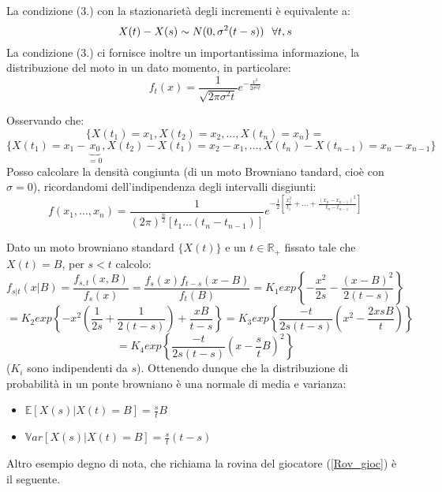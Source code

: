 La condizione (3.) con la stazionarietà degli incrementi è equivalente a: 
\[X(t)-X(s)\sim N(0,\sigma^2(t-s)) \hspace{7px} \forall t,s\]
La condizione (3.) ci fornisce inoltre un importantissima informazione, la distribuzione del moto in un dato momento, in particolare:
\[f_t(x)=\frac{1}{\sqrt{2\pi\sigma^2 t}}e^{-\frac{x^2}{2\sigma^2t}}\]

Osservando che:
\[\{X(t_1)=x_1,X(t_2)=x_2,\dots,X(t_n)=x_n\}=\]
\[\{X(t_1)=x_1-\underbrace{x_0}_{=0},X(t_2)-X(t_1)=x_2-x_1,\dots,X(t_n)-X(t_{n-1})=x_n-x_{n-1}\}\]
Posso calcolare la densità congiunta (di un moto Browniano tandard, cioè con $\sigma=0$), ricordandomi dell'indipendenza degli intervalli disgiunti:
\[f(x_1,\dots,x_n)=\frac{1}{(2\pi)^{\frac{n}{2}}[t_1\dots(t_n-t_{n-1})]}e^{-\frac{1}{2}\left[\frac{x_1^2}{t_1}+\dots+\frac{(x_n-x_{n-1})^2}{t_n-t_{n-1}}\right]}\]

\begin{example}
Dato un moto browniano standard $\{X(t)\}$ e un $t\in\mathbb{R}_+$ fissato tale che $X(t)=B$, per $s<t$ calcolo:
\[f_{s|t}(x|B)=\frac{f_{s,t}(x,B)}{f_{s}(x)}=\frac{f_s(x)f_{t-s}(x-B)}{f_t(B)}=K_1exp\left\{-\frac{x^2}{2s}-\frac{(x-B)^2}{2(t-s)}\right\}\]
\[=K_2exp\left\{-x^2\left(\frac{1}{2s}+\frac{1}{2(t-s)}\right)+\frac{xB}{t-s}\right\}=K_3exp\left\{\frac{-t}{2s(t-s)}\left(x^2-\frac{2xsB}{t}\right)\right\}\]
\[=K_4exp\left\{\frac{-t}{2s(t-s)}\left(x-\frac{s}{t}B\right)^2\right\}\]
($K_i$ sono indipendenti da $s$).
\newline Ottenendo dunque che la distribuzione di probabilità in un ponte browniano è una normale di media e varianza:
\begin{itemize}
    \item $\mathbb{E}[X(s)|X(t)=B]=\frac{s}{t}B$
    \item $\mathbb{V}ar[X(s)|X(t)=B]=\frac{s}{t}(t-s)$
\end{itemize}
\end{example}

Altro esempio degno di nota, che richiama la rovina del giocatore (\ref{Rov_gioc}) è il seguente.

